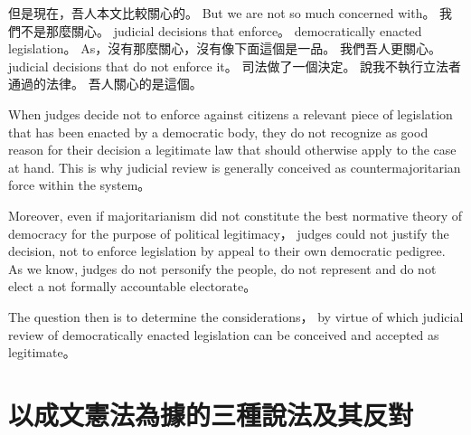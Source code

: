 \hypertarget{w02:cue:1683}{}但是現在，吾人本文比較關心的。
\hypertarget{w02:cue:1684}{}But we are not so much concerned with。
\hypertarget{w02:cue:1685}{}我們不是那麼關心。
\hypertarget{w02:cue:1686}{}judicial decisions that enforce。
\hypertarget{w02:cue:1687}{}democratically enacted legislation。
\hypertarget{w02:cue:1688}{}As，沒有那麼關心，沒有像下面這個是一品。
\hypertarget{w02:cue:1689}{}我們吾人更關心。
\hypertarget{w02:cue:1690}{}judicial decisions that do not enforce it。
\hypertarget{w02:cue:1691}{}司法做了一個決定。
\hypertarget{w02:cue:1692}{}說我不執行立法者通過的法律。
\hypertarget{w02:cue:1693}{}吾人關心的是這個。

\hypertarget{w02:cue:1694}{}When judges decide not to enforce against citizens a relevant piece of legislation that has been enacted by a democratic body, they do not recognize as good reason for their decision a legitimate law that should otherwise apply to the case at hand.
\hypertarget{w02:cue:1695}{}This is why judicial review is generally conceived as countermajoritarian force within the system。

\hypertarget{w02:cue:1696}{}Moreover, even if majoritarianism did not constitute the best normative theory of democracy for the purpose of political legitimacy，
\hypertarget{w02:cue:1697}{}judges could not justify the decision, not to enforce legislation by appeal to their own democratic pedigree.
\hypertarget{w02:cue:1698}{}As we know, judges do not personify the people, do not represent and do not elect a not formally accountable electorate。

\hypertarget{w02:cue:1699}{}The question then is to determine the considerations，
\hypertarget{w02:cue:1700}{}by virtue of which judicial review of democratically enacted legislation can be conceived and accepted as legitimate。

\section{以成文憲法為據的三種說法及其反對}

